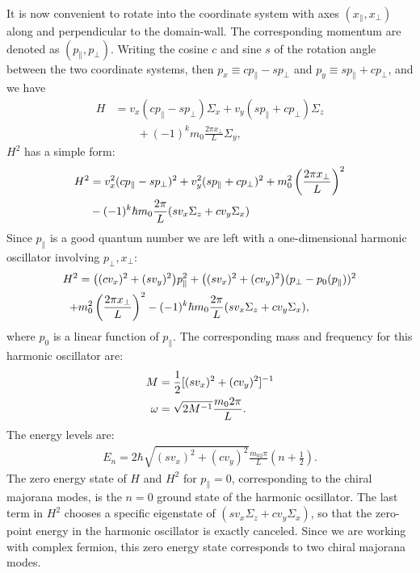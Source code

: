 \begin{subappendices}
	It is now convenient to rotate into the coordinate system with axes $(x_\parallel,x_\perp)$ along and perpendicular to the domain-wall. The corresponding momentum are denoted as $(p_\parallel,p_\perp)$. Writing the cosine $c$ and sine $s$ of the rotation angle between the two coordinate systems, then $p_x\equiv c p_\parallel- s p_\perp$ and $p_y\equiv s p_\parallel+c p_\perp$, and we have
	\begin{align}
		H & =v_x (c p_\parallel- s p_\perp)\Sigma_x+v_y (s p_\parallel+c p_\perp)\Sigma_z\nonumber \\
		  & \qquad+(-1)^k m_0\frac{2\pi x_\perp}{L}\Sigma_y,
	\end{align}
	$H^2$ has a simple form:
	\begin{align}
		H^2 & =v_x^2(c p_\parallel- s p_\perp)^2+v_y^2(s p_\parallel+c p_\perp)^2+m_0^2\left(\frac{2\pi x_\perp}{L}\right)^2\notag \\
		    & -(-1)^k \hbar m_0\frac{2\pi}{L}(sv_x\Sigma_z+c v_y\Sigma_x)
	\end{align}
	Since $p_\parallel$ is a good quantum number we are left with a one-dimensional harmonic oscillator involving $p_\perp,x_\perp$:
	\begin{align}
		H^2 & =\big((cv_x)^2+(sv_y)^2\big)p_\parallel^2+\big((sv_x)^2+(cv_y)^2\big)(p_\perp - p_0(p_\parallel) )^2\notag \\
		+   & m_0^2\left(\frac{2\pi x_\perp}{L}\right)^2-(-1)^k \hbar m_0\frac{2\pi}{L}(sv_x\Sigma_z+c v_y\Sigma_x),
	\end{align}
	where $p_0$ is a linear function of $p_\parallel$. The corresponding mass and frequency for this harmonic oscillator are:
	\begin{align}
		M      & =\frac{1}{2}[(sv_x)^2+(cv_y)^2]^{-1}\notag \\
		\omega & =\sqrt{2M^{-1}}\frac{m_02\pi}{L}.
	\end{align}
	The energy levels are:
	\begin{align}
		E_n=2\hbar\sqrt{(sv_x)^2+(cv_y)^2}\frac{m_02\pi}{L}(n+\frac{1}{2}).
	\end{align}
	The zero energy state of $H$ and $H^2$ for $p_\parallel=0$, corresponding to the chiral majorana modes, is the $n=0$ ground state of the harmonic ocsillator. The last term in $H^2$ chooses a specific eigenstate of $(sv_x\Sigma_z+c v_y\Sigma_x)$, so that the zero-point energy in the harmonic oscillator is exactly canceled. Since we are working with complex fermion, this zero energy state corresponds to two chiral majorana modes.


\end{subappendices}
